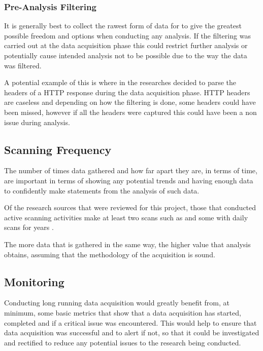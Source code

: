 \documentclass{mscreport}
\begin{document}
\subsubsection{Pre-Analysis Filtering}
It is generally best to collect the rawest form of data for to give the greatest possible freedom and options when conducting any analysis. If the filtering was carried out at the data acquisition phase this could restrict further analysis or potentially cause intended analysis not to be possible due to the way the data was filtered.

\vspace{0.3cm} \noindent
A potential example of this is where in \cite{Buchanan2018-xz} the researches decided to parse the headers of a HTTP response during the data acquisition phase. HTTP headers are caseless \cite{Berners-Lee1996-ji} and depending on how the filtering is done, some headers could have been missed, however if all the headers were captured this could have been a non issue during analysis.

\subsection{Scanning Frequency}

The number of times data gathered and how far apart they are, in terms of time, are important in terms of showing any potential trends and having enough data to confidently make statements from the analysis of such data.

\vspace{0.3cm} \noindent
Of the research sources that were reviewed for this project, those that conducted active scanning activities make at least two scans such as \cite{Buchanan2018-xz,Amann2017-co,Chen2016-dl,Kumar2017-qw} and some with daily scans for years \cite{Holz2020-ha}.

\vspace{0.3cm} \noindent
The more data that is gathered in the same way, the higher value that analysis obtains, assuming that the methodology of the acquisition is sound.

\subsection{Monitoring}

Conducting long running data acquisition would greatly benefit from, at minimum, some basic metrics that show that a data acquisition has started, completed and if a critical issue was encountered. This would help to ensure that data acquisition was successful and to alert if not, so that it could be investigated and rectified to reduce any potential issues to the research being conducted.
\end{document}
